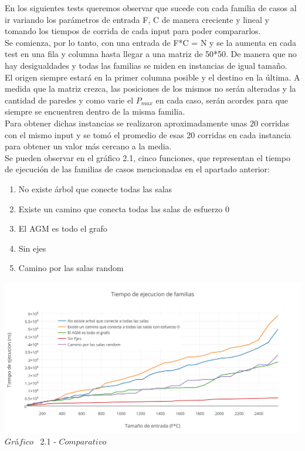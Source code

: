 \indent En los siguientes tests queremos observar que sucede con cada familia de casos al ir variando los parámetros de entrada F, C de manera creciente y lineal y tomando los tiempos de corrida de cada input para poder compararlos.\\
Se comienza, por lo tanto, con una entrada de F*C = N y se la aumenta en cada test en una fila y columna hasta llegar a una matriz de 50*50. De manera que no hay desigualdades y todas las familias se miden en instancias de igual tamaño.\\
El origen siempre estará en la primer columna posible y el destino en la última. A medida que la matriz crezca, las posiciones de los mismos no serán alteradas y la cantidad de paredes y como varie el $P_{max}$ en cada caso, serán acordes para que siempre se encuentren dentro de la misma familia.\\

Para obtener dichas instancias se realizaron aproximadamente unas 20 corridas con el mismo input y se tom\'o el promedio de esas 20 corridas en cada instancia para obtener un valor m\'as cercano a la media.\\ 

Se pueden observar en el  gráfico 2.1, cinco funciones, que representan el tiempo de ejecuci\'on de las familias de casos mencionadas en el apartado anterior:

\begin{enumerate}
\item No existe árbol que conecte todas las salas
\item Existe un camino que conecta todas las salas de esfuerzo 0
\item El AGM es todo el grafo
\item Sin ejes
\item Camino por las salas random
\end{enumerate}

\vspace*{0.3cm} \vspace*{0.3cm}
  \begin{center}
 \includegraphics[scale=0.65]{./EJ2/comparativo.png}
 {$Gr$\'a$fico$ \ 2.1 - $Comparativo$}
  \end{center}
  \vspace*{0.3cm}
 

